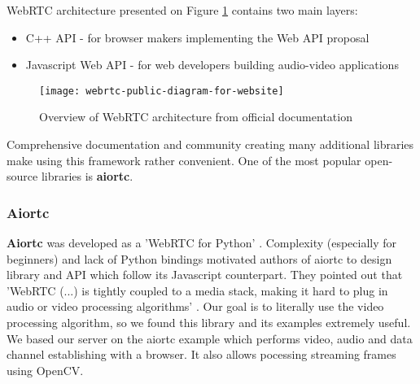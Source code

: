 \documentclass[../Main.tex]{subfiles}
\begin{document}
    WebRTC architecture presented on  Figure \ref{fig:webrtc-public-diagram-for-website} contains two main layers: 
    \begin{itemize}
    \item C++ API - for browser makers implementing the Web API proposal
    \item Javascript Web API - for web developers building audio-video applications \\
    \end{itemize}
    
    \begin{figure}[h]
    \centering
    \texttt{[image: webrtc-public-diagram-for-website]}
    \caption{Overview of WebRTC architecture from official documentation \cite{webrtc}}
    \label{fig:webrtc-public-diagram-for-website}
    \end{figure}

    Comprehensive documentation and community creating many additional libraries make using this framework rather convenient. One of the most popular open-source libraries is \textbf{aiortc}.

    \subsubsection{Aiortc}
    \textbf{Aiortc} was developed as a 'WebRTC for Python' \cite{aiortcdocs}. Complexity (especially for beginners) and lack of Python bindings motivated authors of aiortc to design library and API which follow its Javascript counterpart. They pointed out that 
    'WebRTC (...) is tightly coupled to a media stack, making it hard to plug in audio or video processing algorithms' \cite{aiortcdocs}. 
    Our goal is to literally use the video processing algorithm, so we found this library and its examples extremely useful. We based our server on the aiortc example which performs video, audio and data channel establishing with a browser. It also allows pocessing streaming frames using OpenCV. 
\end{document}
